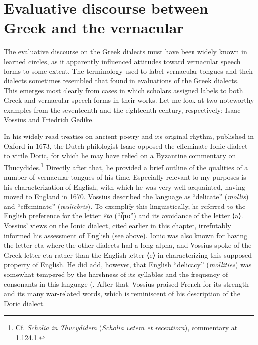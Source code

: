 \section{Evaluative discourse between Greek and the vernacular}\label{sec:7.3}


The evaluative discourse on the Greek dialects must have been widely known in learned circles, as it apparently influenced attitudes toward vernacular speech forms to some extent. The terminology used to label vernacular tongues and their dialects sometimes resembled that found in evaluations of the Greek dialects. This emerges most clearly from cases in which scholars assigned labels to both Greek and vernacular speech forms in their works. Let me look at two noteworthy examples from the seventeenth and the eighteenth century, respectively: Isaac Vossius and Friedrich Gedike.

In his widely read treatise on ancient poetry and its original rhythm, published in Oxford in 1673, the Dutch philologist Isaac \citet[54--55]{Vossius1673} opposed the effeminate Ionic dialect to virile Doric, for which he may have relied on a Byzantine commentary on Thucydides.\footnote{Cf. \textit{Scholia in Thucydidem} (\textit{Scholia uetera et recentiora}), commentary at 1.124.1.} Directly after that, he provided a brief outline of the qualities of a number of vernacular tongues of his time. Especially relevant to my purposes is his characterization of English, with which he was very well acquainted, having moved to England in 1670. Vossius described the language as “delicate” (\textit{mollis}) and “effeminate” (\textit{muliebris}). To exemplify this linguistically, he referred to the English preference for the letter \textit{êta} (“ἦτα”) and its avoidance of the letter ⟨a⟩. Vossius’ views on the Ionic dialect, cited earlier in this chapter, irrefutably informed his assessment of English (see  above). Ionic was also known for having the letter eta where the other dialects had a long alpha, and Vossius spoke of the Greek letter eta rather than the English letter ⟨e⟩ in characterizing this supposed property of English. He did add, however, that English “delicacy” (\textit{mollities}) was somewhat tempered by the harshness of its syllables and the frequency of consonants in this language (\citet[56]{Vossius1673}. After that, Vossius praised French for its strength and its many war-related words, which is reminiscent of his description of the Doric dialect.

